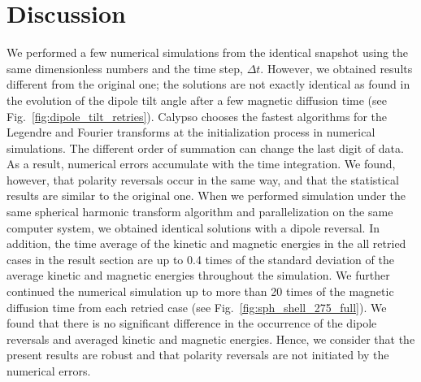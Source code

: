 \section{Discussion}
\label{section:discussion}

{\color{teal}
We performed a few numerical simulations from the identical snapshot using the same dimensionless numbers and the time step, $\Delta t$.
}
However, we obtained results different from the original one; the solutions are not exactly identical
as found in the evolution of the dipole tilt angle after a few magnetic diffusion time (see Fig.~\ref{fig:dipole_tilt_retries}). 
Calypso chooses the fastest algorithms for the Legendre and Fourier transforms at the initialization process in numerical simulations. 
The different order of summation can change the last digit of data. 
As a result, numerical errors accumulate with the time integration. 
We found, however, that polarity reversals occur in the same way, and that the statistical results are similar to the original one.
{\color{blue} 
When we performed simulation under the same spherical harmonic transform algorithm and parallelization on the same computer system, we obtained identical solutions with a dipole reversal. In addition, the time average of the kinetic and magnetic energies in the all retried cases in the result section are up to 0.4 times of the standard deviation of the average kinetic and magnetic energies throughout the simulation. 
{\color{magenta}
We further continued the numerical simulation up to more than 20 times of the magnetic diffusion time from each retried case (see Fig.~\ref{fig:sph_shell_275_full}).
We found that there is no significant difference in the occurrence of the dipole reversals and averaged kinetic and magnetic energies.
}
{\color{teal}
Hence, we consider that the present results are robust and that polarity reversals are not initiated by the numerical errors.
}
}

